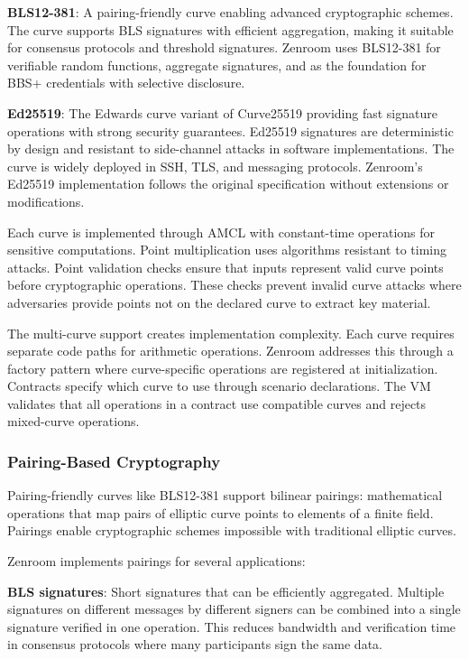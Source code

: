\textbf{BLS12-381}: A pairing-friendly curve enabling advanced
cryptographic schemes. The curve supports BLS signatures with
efficient aggregation, making it suitable for consensus protocols and
threshold signatures. Zenroom uses BLS12-381 for verifiable random
functions, aggregate signatures, and as the foundation for BBS+
credentials with selective disclosure.

\textbf{Ed25519}: The Edwards curve variant of Curve25519 providing
fast signature operations with strong security guarantees. Ed25519
signatures are deterministic by design and resistant to side-channel
attacks in software implementations. The curve is widely deployed in
SSH, TLS, and messaging protocols. Zenroom's Ed25519 implementation
follows the original specification without extensions or
modifications.

Each curve is implemented through AMCL with constant-time operations
for sensitive computations. Point multiplication uses algorithms
resistant to timing attacks. Point validation checks ensure that
inputs represent valid curve points before cryptographic
operations. These checks prevent invalid curve attacks where
adversaries provide points not on the declared curve to extract key
material.

The multi-curve support creates implementation complexity. Each curve
requires separate code paths for arithmetic operations. Zenroom
addresses this through a factory pattern where curve-specific
operations are registered at initialization. Contracts specify which
curve to use through scenario declarations. The VM validates that all
operations in a contract use compatible curves and rejects mixed-curve
operations.

\subsubsection{Pairing-Based Cryptography}

Pairing-friendly curves like BLS12-381 support bilinear pairings:
mathematical operations that map pairs of elliptic curve points to
elements of a finite field. Pairings enable cryptographic schemes
impossible with traditional elliptic curves.

Zenroom implements pairings for several applications:

\textbf{BLS signatures}: Short signatures that can be efficiently
aggregated. Multiple signatures on different messages by different
signers can be combined into a single signature verified in one
operation. This reduces bandwidth and verification time in consensus
protocols where many participants sign the same data.

